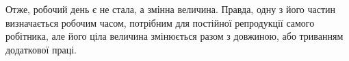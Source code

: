 Отже, робочий день є не стала, а змінна величина. Правда,
одну з його частин визначається робочим часом, потрібним для
постійної репродукції самого робітника, але його ціла величина
змінюється разом з довжиною, або триванням додаткової праці.
\parbreak{}  %
